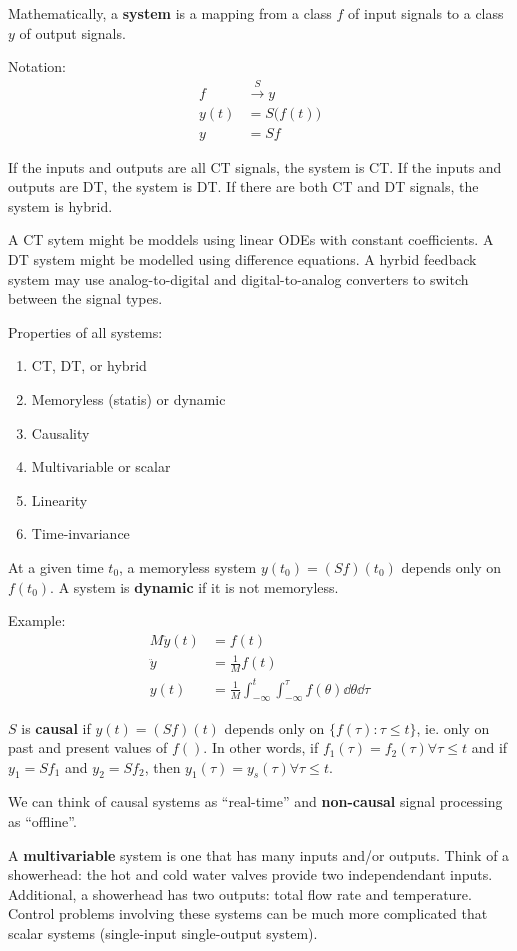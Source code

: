 \documentclass[12pt]{article}
\begin{document}
Mathematically, a {\bf system} is a mapping from a class $f$ of input signals to a class $y$ of output signals.

Notation:
\begin{align*}
f &\xrightarrow{S} y \\
y(t) &= S\bigl(f(t)\bigl) \\
y &= Sf
\end{align*}

If the inputs and outputs are all CT signals, the system is CT. If the inputs and outputs are DT, the system is DT. If there are both CT and DT signals, the system is hybrid.

A CT sytem might be moddels using linear ODEs with constant coefficients. A DT system might be modelled using difference equations. A hyrbid feedback system may use analog-to-digital and digital-to-analog converters to switch between the signal types.

Properties of all systems:
\begin{enumerate}
\item CT, DT, or hybrid
\item Memoryless (statis) or dynamic
\item Causality
\item Multivariable or scalar
\item Linearity
\item Time-invariance
\end{enumerate}

At a given time $t_0$, a memoryless system $y(t_0) = (Sf)(t_0)$ depends only on $f(t_0)$. A system is {\bf dynamic} if it is not memoryless.

Example:
\begin{align*}
M\ddot y(t) &= f(t) \\
\ddot y &= \frac{1}{M} f(t) \\
y(t) &= \frac{1}{M} \int_{-\infty}^t \int_{-\infty}^\tau f(\theta) \dd\theta \dd \tau
\end{align*}

$S$ is {\bf causal} if $y(t) = (Sf)(t)$ depends only on $\{ f(\tau) : \tau \leq t \}$, ie. only on past and present values of $f()$. In other words, if $f_1(\tau) = f_2(\tau) \forall \tau \leq t$ and if $y_1 = Sf_1$ and $y_2 = Sf_2$, then $y_1(\tau) = y_s(\tau) \forall \tau \leq t$.

We can think of causal systems as ``real-time'' and {\bf non-causal} signal processing as ``offline''.

A {\bf multivariable} system is one that has many inputs and/or outputs. Think of a showerhead: the hot and cold water valves provide two independendant inputs. Additional, a showerhead has two outputs: total flow rate and temperature. Control problems involving these systems can be much more complicated that scalar systems (single-input single-output system).
\end{document}

